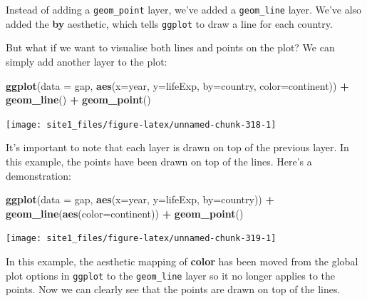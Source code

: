 \documentclass[]{book}
\newenvironment{Shaded}{\begin{snugshade}}{\end{snugshade}}
\newcommand{\KeywordTok}[1]{\textcolor[rgb]{0.13,0.29,0.53}{\textbf{#1}}}
\newcommand{\DataTypeTok}[1]{\textcolor[rgb]{0.13,0.29,0.53}{#1}}
\newcommand{\StringTok}[1]{\textcolor[rgb]{0.31,0.60,0.02}{#1}}
\newcommand{\OperatorTok}[1]{\textcolor[rgb]{0.81,0.36,0.00}{\textbf{#1}}}
\newcommand{\NormalTok}[1]{#1}
\begin{document}
Instead of adding a \texttt{geom\_point} layer, we've added a
\texttt{geom\_line} layer. We've also added the \textbf{by} aesthetic,
which tells \texttt{ggplot} to draw a line for each country.

But what if we want to visualise both lines and points on the plot? We
can simply add another layer to the plot:

\begin{Shaded}
\begin{Highlighting}[]
\KeywordTok{ggplot}\NormalTok{(}\DataTypeTok{data =}\NormalTok{ gap, }\KeywordTok{aes}\NormalTok{(}\DataTypeTok{x=}\NormalTok{year, }\DataTypeTok{y=}\NormalTok{lifeExp, }\DataTypeTok{by=}\NormalTok{country, }\DataTypeTok{color=}\NormalTok{continent)) }\OperatorTok{+}\StringTok{ }
\StringTok{  }\KeywordTok{geom_line}\NormalTok{() }\OperatorTok{+}\StringTok{ }
\StringTok{  }\KeywordTok{geom_point}\NormalTok{()}
\end{Highlighting}
\end{Shaded}

\begin{center}\texttt{[image: site1\_files/figure-latex/unnamed-chunk-318-1]} \end{center}

It's important to note that each layer is drawn on top of the previous
layer. In this example, the points have been drawn on top of the lines.
Here's a demonstration:

\begin{Shaded}
\begin{Highlighting}[]
\KeywordTok{ggplot}\NormalTok{(}\DataTypeTok{data =}\NormalTok{ gap, }\KeywordTok{aes}\NormalTok{(}\DataTypeTok{x=}\NormalTok{year, }\DataTypeTok{y=}\NormalTok{lifeExp, }\DataTypeTok{by=}\NormalTok{country)) }\OperatorTok{+}\StringTok{ }
\StringTok{  }\KeywordTok{geom_line}\NormalTok{(}\KeywordTok{aes}\NormalTok{(}\DataTypeTok{color=}\NormalTok{continent)) }\OperatorTok{+}\StringTok{ }
\StringTok{  }\KeywordTok{geom_point}\NormalTok{()}
\end{Highlighting}
\end{Shaded}

\begin{center}\texttt{[image: site1\_files/figure-latex/unnamed-chunk-319-1]} \end{center}

In this example, the aesthetic mapping of \textbf{color} has been moved
from the global plot options in \texttt{ggplot} to the
\texttt{geom\_line} layer so it no longer applies to the points. Now we
can clearly see that the points are drawn on top of the lines.
\end{document}
